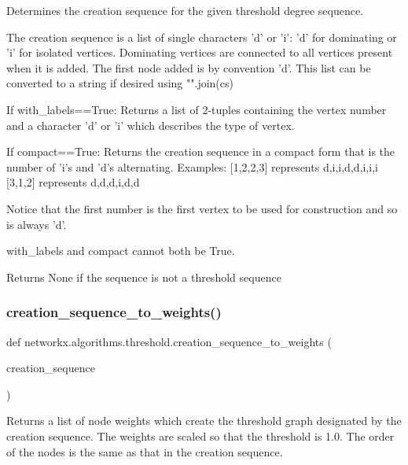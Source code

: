 \begin{DoxyVerb}Determines the creation sequence for the given threshold degree sequence.

The creation sequence is a list of single characters 'd'
or 'i': 'd' for dominating or 'i' for isolated vertices.
Dominating vertices are connected to all vertices present when it
is added.  The first node added is by convention 'd'.
This list can be converted to a string if desired using "".join(cs)

If with_labels==True:
Returns a list of 2-tuples containing the vertex number
and a character 'd' or 'i' which describes the type of vertex.

If compact==True:
Returns the creation sequence in a compact form that is the number
of 'i's and 'd's alternating.
Examples:
[1,2,2,3] represents d,i,i,d,d,i,i,i
[3,1,2] represents d,d,d,i,d,d

Notice that the first number is the first vertex to be used for
construction and so is always 'd'.

with_labels and compact cannot both be True.

Returns None if the sequence is not a threshold sequence
\end{DoxyVerb}
 \mbox{\label{namespacenetworkx_1_1algorithms_1_1threshold_a45645774713f4a3a1d0c1cf4ef407742}} 
\subsubsection{\texorpdfstring{creation\+\_\+sequence\+\_\+to\+\_\+weights()}{creation\_sequence\_to\_weights()}}
{\footnotesize\ttfamily def networkx.\+algorithms.\+threshold.\+creation\+\_\+sequence\+\_\+to\+\_\+weights (\begin{DoxyParamCaption}\item[{}]{creation\+\_\+sequence }\end{DoxyParamCaption})}

\begin{DoxyVerb}Returns a list of node weights which create the threshold
graph designated by the creation sequence.  The weights
are scaled so that the threshold is 1.0.  The order of the
nodes is the same as that in the creation sequence.
\end{DoxyVerb}
 \mbox{\label{namespacenetworkx_1_1algorithms_1_1threshold_a41774a3d894859356bb1420f38932d10}} 

